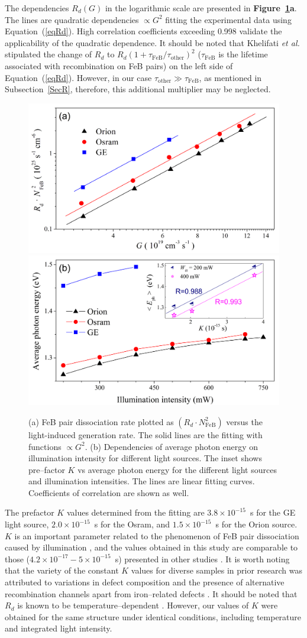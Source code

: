 \documentclass{WileyMSP-template}
\begin{document}
The dependencies $R_d (G)$ in the logarithmic scale are presented in \textbf{Figure~\ref{fig6}a}.
The lines are quadratic dependencies $\propto G^2$ fitting the experimental data using Equation~(\ref{eqRd}).
High correlation coefficients exceeding 0.998 validate the applicability of the quadratic dependence.
It should be noted that Khelifati \emph{et al.} \cite{FeBKin2019} stipulated the change of $R_d$ to
$R_d\left(1+\tau_\mathrm{FeB}/\tau_\mathrm{other}\right)^2$ ($\tau_\mathrm{FeB}$ is the lifetime associated with recombination on FeB pairs)
on the left side of Equation~(\ref{eqRd}).
However, in our case $\tau_\mathrm{other}\gg \tau_\mathrm{FeB}$, as mentioned in Subsection~\ref{SecR}, therefore,
this additional multiplier may be neglected.


\begin{figure}
\centering
  \includegraphics[width=0.4\linewidth]{Fig6a.png}
  \includegraphics[width=0.4\linewidth]{Fig6b.png}
  \caption{
  (a) FeB pair dissociation rate plotted as $\left(R_d\cdot N_\mathrm{FeB}^2\right)$ versus the light-induced
  generation rate. The solid lines are the fitting with functions $\propto G^2$.
  (b) Dependencies of average photon energy on illumination intensity for different light sources.
  The inset shows pre--factor $K$ vs average photon energy for the different light sources and illumination intensities.
  The lines are linear fitting curves. Coefficients of correlation are shown as well.
  }
  \label{fig6}
\end{figure}

The prefactor $K$ values determined from the fitting are
$3.8\times10^{-15}$~s for the GE light source,
$2.0\times10^{-15}$~s for the Osram, and
$1.5\times10^{-15}$~s for the Orion source.
$K$ is an important parameter related to the phenomenon of FeB pair dissociation caused by illumination \cite{FeBKin2019},
and the values obtained in this study are comparable to those ($4.2\times10^{-17}-5\times10^{-15}$~s) presented in other studies \cite{FeBLight2,FeBAssJAP2014,FeBKin2019}.
It is worth noting that the variety of the constant $K$ values for diverse samples in prior research was attributed
to variations in defect composition and the presence of alternative recombination channels apart from iron--related defects \cite{FeBLight2,FeBAssJAP2014}.
It should be noted that $R_d$ is known to be temperature--dependent \cite{Lagowskii1993}.
However, our values of $K$ were obtained for the same structure under identical conditions, including temperature and integrated light intensity.
\end{document}
